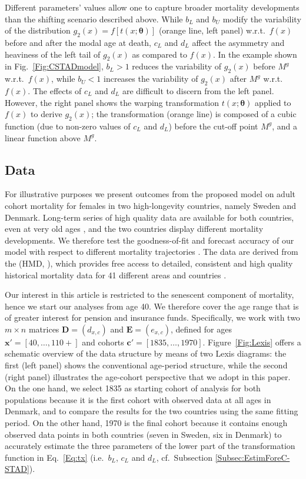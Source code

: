 \documentclass[11pt, a4paper]{article}
\begin{document}
Different parameters' values allow one to capture broader mortality developments than the shifting scenario described above. While $b_L$ and $b_U$ modify the variability of the distribution $g_2(x)=f\left[t(x;\bm{\theta})\right]$ (orange line, left panel) w.r.t.~$f(x)$ before and after the modal age at death, $c_L$ and $d_L$ affect the asymmetry and heaviness of the left tail of $g_2(x)$ as compared to $f(x)$. In the example shown in Fig.~\ref{Fig:CSTADmodel}, $b_L > 1$ reduces the variability of $g_2(x)$ before $M^g$ w.r.t.~$f(x)$, while $b_U < 1$ increases the variability of $g_2(x)$ after $M^g$ w.r.t.~$f(x)$. The effects of $c_L$ and $d_L$ are difficult to discern from the left panel. However, the right panel shows the warping transformation $t(x;\bm{\theta})$ applied to $f(x)$ to derive $g_2(x)$; the transformation (orange line) is composed of a cubic function (due to non-zero values of $c_L$ and $d_L$) before the cut-off point $M^g$, and a linear function above $M^g$.

\subsection{Data}
\label{Subsec:Data}
For illustrative purposes we present outcomes from the proposed model on adult cohort mortality for females in two high-longevity countries, namely Sweden and Denmark. Long-term series of high quality data are available for both countries, even at very old ages \citep{vaupel1994longer,wilmoth1996extreme,AndreevBookDanemark}, and the two countries display different mortality developments. We therefore test the goodness-of-fit and forecast accuracy of our model with respect to different mortality trajectories \citep{christensen2010divergent}. The data are derived from the \citeauthor{HMD} (HMD, \citeyear{HMD}), which provides free access to detailed, consistent and high quality historical mortality data for 41 different areas and countries \citep{barbieri2015data}.

Our interest in this article is restricted to the senescent component of mortality, hence we start our analyses from age 40. We therefore cover the age range that is of greater interest for pension and insurance funds. Specifically, we work with two $m \times n$ matrices $\bm{D} = (d_{x,c})$ and $\bm{E} = (e_{x,c})$, defined for ages $\bm{x}'=\left[40,\dots,110+\right]$ and cohorts $\bm{c}'=\left[1835,\dots,1970\right]$. Figure~\ref{Fig:Lexis} offers a schematic overview of the data structure by means of two Lexis diagrams: the first (left panel) shows the conventional age-period structure, while the second (right panel) illustrates the age-cohort perspective that we adopt in this paper. On the one hand, we select 1835 as starting cohort of analysis for both populations because it is the first cohort with observed data at all ages in Denmark, and to compare the results for the two countries using the same fitting period. On the other hand, 1970 is the final cohort because it contains enough observed data points in both countries (seven in Sweden, six in Denmark) to accurately estimate the three parameters {\color{red}of the lower part of the transformation function in Eq.~\eqref{Eq:tx}} ({\color{red}i.e.~$b_L$, $c_L$ and $d_L$}, cf.~Subsection \ref{Subsec:EstimForeC-STAD}). 
\end{document}
